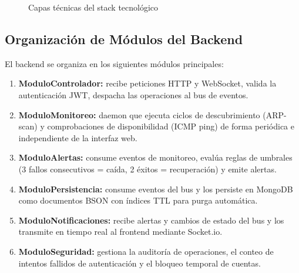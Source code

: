 \documentclass[12pt,a4paper]{report}
\begin{document}
\begin{figure}[htbp]
\centering
{}
\caption{Capas técnicas del stack tecnológico}\label{fig:stack_layers}
\end{figure}

\subsection{Organización de Módulos del Backend}

El backend se organiza en los siguientes módulos principales:

\begin{enumerate}
  \item \textbf{ModuloControlador:} recibe peticiones HTTP y WebSocket, valida la autenticación JWT, despacha las operaciones al bus de eventos.
  \item \textbf{ModuloMonitoreo:} daemon que ejecuta ciclos de descubrimiento (ARP-scan) y comprobaciones de disponibilidad (ICMP ping) de forma periódica e independiente de la interfaz web.
  \item \textbf{ModuloAlertas:} consume eventos de monitoreo, evalúa reglas de umbrales (3 fallos consecutivos = caída, 2 éxitos = recuperación) y emite alertas.
  \item \textbf{ModuloPersistencia:} consume eventos del bus y los persiste en MongoDB como documentos BSON con índices TTL para purga automática.
  \item \textbf{ModuloNotificaciones:} recibe alertas y cambios de estado del bus y los transmite en tiempo real al frontend mediante Socket.io.
  \item \textbf{ModuloSeguridad:} gestiona la auditoría de operaciones, el conteo de intentos fallidos de autenticación y el bloqueo temporal de cuentas.
\end{enumerate}
\end{document}
